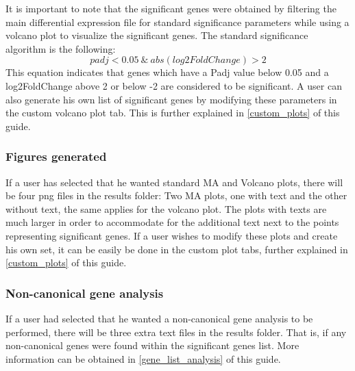 \documentclass[11pt]{article}
\begin{document}
It is important to note that the significant genes were obtained by filtering the main differential expression file for standard significance parameters while using a volcano plot to visualize the significant genes. The standard significance algorithm is the following:
\[padj<0.05 \ \&\ abs(log2FoldChange)>2\]
This equation indicates that genes which have a Padj value below 0.05 and a log2FoldChange above 2 or below -2 are considered to be significant. A user can also generate his own list of significant genes by modifying these parameters in the custom volcano plot tab. This is further explained in \autoref{custom_plots} of this guide.

\subsubsection{Figures generated}
If a user has selected that he wanted standard MA and Volcano plots, there will be four png files in the results folder: Two MA plots, one with text and the other without text, the same applies for the volcano plot.
The plots with texts are much larger in order to accommodate for the additional text next to the points representing significant genes.
If a user wishes to modify these plots and create his own set, it can be easily be done in the custom plot tabs, further explained in \autoref{custom_plots} of this guide.

\subsubsection{Non-canonical gene analysis}
If a user had selected that he wanted a non-canonical gene analysis to be performed, there will be three extra text files in the results folder. That is, if any non-canonical genes were found within the significant genes list. More information can be obtained in \autoref{gene_list_analysis} of this guide.
\end{document}

